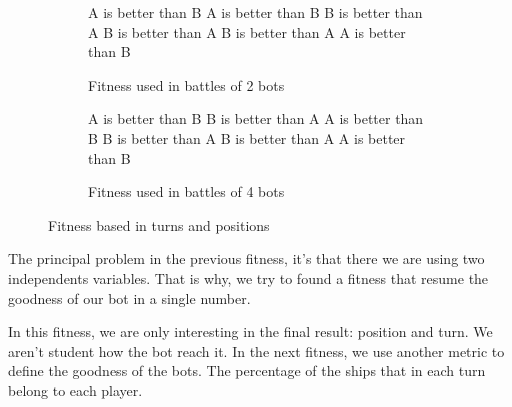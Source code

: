 \documentclass{llncs}
\begin{document}
\begin{figure}[h]
\tiny
\begin{subfigure}[!]{0.5\textwidth}
\begin{algorithmic}
                \State A is better than B
                \State A is better than B
            \Else
                \State B is better than A
            \EndIf
        \Else
                \State B is better than A
                \State B is better than A
            \Else
                \State A is better than B
            \EndIf
        \EndIf
        \end{algorithmic}
        \label{fig:fitness_turns_positions:2}
\caption{Fitness used in battles of 2 bots}
\end{subfigure}
\begin{subfigure}[!]{0.5\textwidth}
    \begin{algorithmic}
            \State A is better than B
            \State B is better than A
        \Else
                    \State A is better than B
                \Else
                    \State B is better than A
                \EndIf
            \Else
                    \State B is better than A
                \Else
                    \State A is better than B
                \EndIf
            \EndIf
        \EndIf
    \end{algorithmic}
    \label{fig:fitness_turns_positions:co}
\caption{Fitness used in battles of 4 bots}
\end{subfigure}
\label{fig:fitness_turns_positions}
\caption{Fitness based in turns and positions}
\end{figure}

The principal problem in the previous fitness, it's that there we are using two independents variables. That is why, we try to found a fitness that resume the goodness of our bot in a single number. %

In this fitness, we are only interesting in the final result: position and turn. We aren't student how the bot reach it. In the next fitness, we use another metric to define the goodness of the bots. The percentage of the ships that in each turn belong to each player. 
\end{document}
